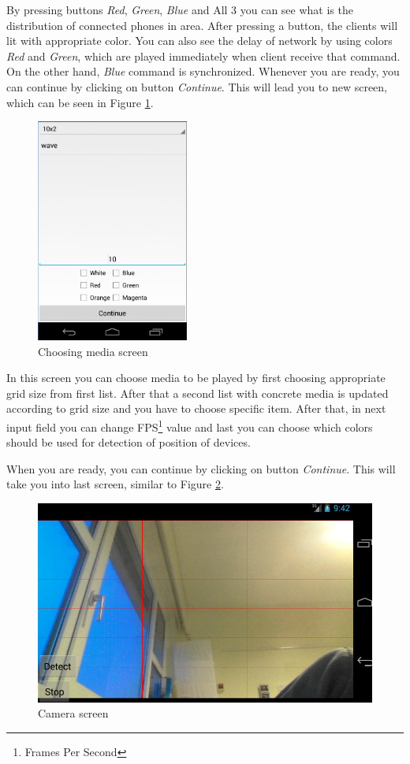 By pressing buttons \emph{Red}, \emph{Green}, \emph{Blue} and All 3 you can see what is the distribution of connected phones in area. 
After pressing a button, the clients will lit with appropriate color.
You can also see the delay of network by using colors \emph{Red} and \emph{Green}, which are played immediately when client receive  that command.
On the other hand, \emph{Blue} command is synchronized.
Whenever you are ready, you can continue by clicking on button \emph{Continue}.
This will lead you to new screen, which can be seen in Figure \ref{fig:manual_server2}.

\begin{figure}[h]
	\centering
		\includegraphics[width=5cm]{appendix/server4.png}
	\caption{Choosing media screen}
	\label{fig:manual_server2}
\end{figure}

In this screen you can choose media to be played by first choosing appropriate grid size from first list.
After that a second list with concrete media is updated according to grid size and you have to choose specific item.
After that, in next input field you can change FPS\footnote{Frames Per Second} value and last you can choose which colors should be used for detection of position of devices.

When you are ready, you can continue by clicking on button \emph{Continue}.
This will take you into last screen, similar to Figure \ref{fig:manual_server3}.
\begin{figure}[h]
	\centering
		\includegraphics[width=12cm]{appendix/server9.png}
	\caption{Camera screen}
	\label{fig:manual_server3}
\end{figure}

